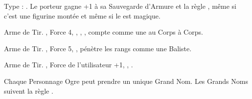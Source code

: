 \closearmyspecialrules











\vspace*{1.5cm}
\startarmyarmoury

\startitemlistonecol

\listitemonecol{\ironfist} Type : \pw{}. Le porteur gagne +1 à sa Sauvegarde d'Armure et la règle \parry{}, même si c'est une figurine montée et même si le \ironfist{} est magique.

\listitemonecol{\braceofogrepistols} Arme de Tir. , Force 4, , , \quicktofire{}, compte comme une \pw{} au Corps à Corps.

\listitemonecol{\ogrecrossbow} Arme de Tir. , Force 5, , pénètre les rangs comme une Baliste.

\listitemonecol{\huntingspear} Arme de Tir. , Force de l'utilisateur +1, , \quicktofire{}.

\enditemlistonecol

\closearmyarmoury






\newpage
{}

\spaceaftersection{}

Chaque Personnage Ogre peut prendre un unique Grand Nom. Les Grands Noms suivent la règle \oneperarmy{}.

